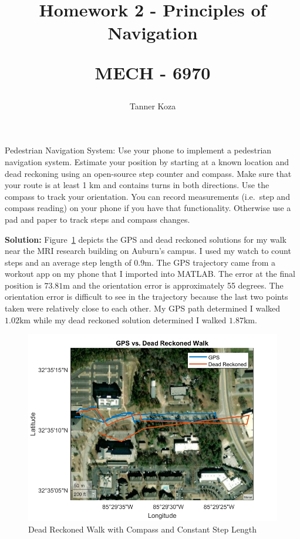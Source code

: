 \documentclass[12pt,letterpaper, onecolumn]{exam}
\begin{document}
\title{Homework 2 - Principles of Navigation

    \large MECH - 6970}
\author{Tanner Koza}
\maketitle
\pointsdroppedatright
\printanswers
\renewcommand{\solution}{\noindent\textbf{Solution:}\enspace}

\begin{questions}
    \question
    Pedestrian Navigation System: Use your phone to implement a pedestrian navigation
    system. Estimate your position by starting at a known location and dead reckoning using
    an open-source step counter and compass. Make sure that your route is at least 1 km and
    contains turns in both directions. Use the compass to track your orientation. You can
    record measurements (i.e.\ step and compass reading) on your phone if you have that
    functionality. Otherwise use a pad and paper to track steps and compass changes.

    \solution
    Figure~\ref{fig:walk} depicts the GPS and dead reckoned solutions for my walk near the MRI research building on Auburn's campus. I used my watch to count steps and an average step length of $0.9 \unit{\m}$. The GPS trajectory came from a workout app on my phone that I imported into MATLAB\@. The error at the final position is $73.81 \unit{\metre}$ and the orientation error is approximately 55 degrees. The orientation error is difficult to see in the trajectory because the last two points taken were relatively close to each other. My GPS path determined I walked $1.02 \unit{\km}$ while my dead reckoned solution determined I walked $1.87 \unit{\km}$.
    \begin{figure}[!h]
        \centering
        \includegraphics[width=\linewidth]{assets/HW2_P1_FIG.png}
        \caption{Dead Reckoned Walk with Compass and Constant Step Length}
        \label{fig:walk}
    \end{figure}
    \clearpage


\end{questions}
\end{document}
